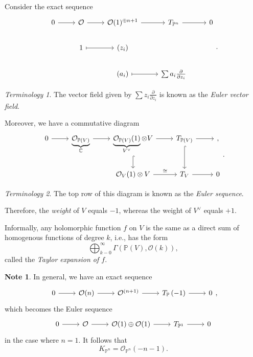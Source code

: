 \documentclass[10pt,letterpaper,cm]{nupset}
\theoremstyle{definition}
\newtheorem{note}[defn]{Note}
\theoremstyle{theorem}
\theoremstyle{remark}
\newtheorem*{term}{Terminology}
\newcommand{\C}{\mathbb C}
\renewcommand{\O}{\mathcal O}
\renewcommand{\P}{\mathbb P}
\newcommand{\1}{\mathbb{1}}
\newcommand{\0}{\vec 0}
\begin{document}
Consider the exact sequence
\[
\begin{tikzcd}
0 \arrow[r] & \O \arrow[r]         & \O(1)^{\oplus{n+1}} \arrow[r]       & T_{\P^n} \arrow[r]                     & 0 \\
            & 1 \arrow[r, maps to] & \left(z_i\right)                    &                                        &   \\
            &                      & \left(a_i\right) \arrow[r, maps to] & \sum a_i\frac{\partial}{\partial{z_i}} &  
\end{tikzcd}
.\]

\begin{term}
The vector field given by $\sum z_i\frac{\partial}{\partial{z_i}}$ is known as the \textit{Euler vector field}.
\end{term}

Moreover, we have a commutative diagram
\[
\begin{tikzcd}
0 \arrow[r] & \underbrace{\O_{\P(V)}}_{\C} \arrow[r] & \underbrace{\O_{\P(V)}(1)}_{V^{\vee}}\otimes V \arrow[r] \arrow[d, hook] & T_{\P(V)} \arrow[r] \arrow[d, hook] & {,} \\
            &                                        & \O_V(1)\otimes V \arrow[r, "\cong"]                                      & T_V \arrow[r]                       & 0  
\end{tikzcd}
.\]
\begin{term} 
The top row of this diagram is known as the \textit{Euler sequence}.
\end{term}
Therefore, the \textit{weight} of $V$ equals ${-1}$, whereas the weight of $V^{\vee}$ equals ${+}1$.

\medskip

Informally, any holomorphic function $f$ on $V$ is the same as a direct sum of homogenous functions of degree $k$, i.e., has the form
\[
\bigoplus_{k-0}^{\infty} \Gamma\left(\P(V), \O(k)\right),
\]
called the \textit{Taylor expansion of $f$}.

\begin{note}
In general, we have an exact sequence
\[
\begin{tikzcd}
0 \arrow[r] & \O(n) \arrow[r] & \O^{\left(n+1\right)} \arrow[r] & T_{\P}\left({-1}\right) \arrow[r] & 0
\end{tikzcd}
,\] which becomes the Euler sequence
\[
\begin{tikzcd}
0 \arrow[r] & \O \arrow[r] & \O(1)\oplus \O(1) \arrow[r] & T_{\P^1} \arrow[r] & 0
\end{tikzcd}
\] in the case where $n=1$. It follows that 
\[
K_{\P^n} = \O_{\P^n}\left({-n}-1\right).
\]
\end{note}
\end{document}
